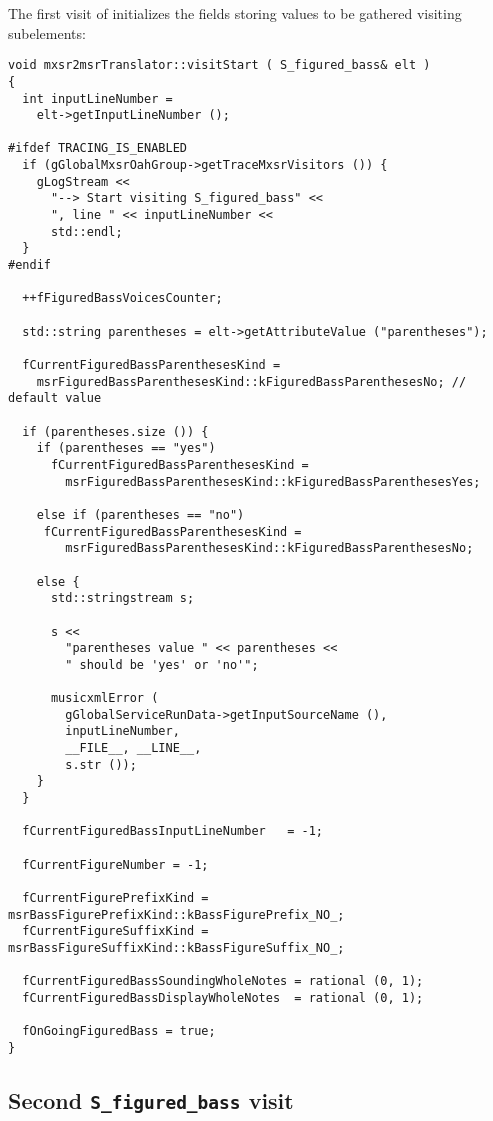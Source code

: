 The first visit of  initializes the fields storing values to be gathered visiting subelements:
\begin{lstlisting}[language=CPlusPlus]
void mxsr2msrTranslator::visitStart ( S_figured_bass& elt )
{
  int inputLineNumber =
    elt->getInputLineNumber ();

#ifdef TRACING_IS_ENABLED
  if (gGlobalMxsrOahGroup->getTraceMxsrVisitors ()) {
    gLogStream <<
      "--> Start visiting S_figured_bass" <<
      ", line " << inputLineNumber <<
      std::endl;
  }
#endif

  ++fFiguredBassVoicesCounter;

  std::string parentheses = elt->getAttributeValue ("parentheses");

  fCurrentFiguredBassParenthesesKind =
    msrFiguredBassParenthesesKind::kFiguredBassParenthesesNo; // default value

  if (parentheses.size ()) {
    if (parentheses == "yes")
      fCurrentFiguredBassParenthesesKind =
        msrFiguredBassParenthesesKind::kFiguredBassParenthesesYes;

    else if (parentheses == "no")
     fCurrentFiguredBassParenthesesKind =
        msrFiguredBassParenthesesKind::kFiguredBassParenthesesNo;

    else {
      std::stringstream s;

      s <<
        "parentheses value " << parentheses <<
        " should be 'yes' or 'no'";

      musicxmlError (
        gGlobalServiceRunData->getInputSourceName (),
        inputLineNumber,
        __FILE__, __LINE__,
        s.str ());
    }
  }

  fCurrentFiguredBassInputLineNumber   = -1;

  fCurrentFigureNumber = -1;

  fCurrentFigurePrefixKind = msrBassFigurePrefixKind::kBassFigurePrefix_NO_;
  fCurrentFigureSuffixKind = msrBassFigureSuffixKind::kBassFigureSuffix_NO_;

  fCurrentFiguredBassSoundingWholeNotes = rational (0, 1);
  fCurrentFiguredBassDisplayWholeNotes  = rational (0, 1);

  fOnGoingFiguredBass = true;
}
\end{lstlisting}


\subsection{Second {\tt S_figured_bass} visit}

